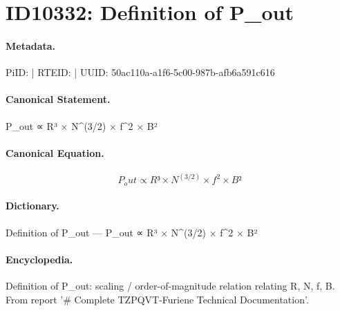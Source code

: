 \section*{ID10332: Definition of P\_out}
\paragraph{Metadata.}
PiID:  | RTEID:  | UUID: 50ac110a-a1f6-5c00-987b-afb6a591c616

\paragraph{Canonical Statement.}
P\_out ∝ R³ × N\textasciicircum{}(3/2) × f\textasciicircum{}2 × B²

\paragraph{Canonical Equation.}
\[
P_out ∝ R³ × N^(3/2) × f^2 × B²
\]

\paragraph{Dictionary.}
Definition of P\_out — P\_out ∝ R³ × N\textasciicircum{}(3/2) × f\textasciicircum{}2 × B²

\paragraph{Encyclopedia.}
Definition of P\_out: scaling / order-of-magnitude relation relating R, N, f, B. From report '\# Complete TZPQVT-Furiene Technical Documentation'.
